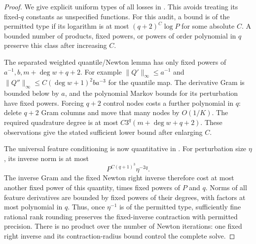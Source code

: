 \documentclass[11pt]{article}
\begin{document}
\begin{proof}
We give explicit uniform types of all losses in
. This avoids treating
its fixed-$q$ constants as unspecified functions.
For this audit, a bound is of the permitted type if its logarithm is
at most $(q+2)^C\log P$ for some absolute $C$. A bounded number of
products, fixed powers, or powers of order polynomial in $q$ preserve
this class after increasing $C$.

The separated weighted quantile/Newton lemma has only fixed powers of
$a^{-1},b,m+\deg w+q+2$. For example
$\|Q'\|_\infty\le a^{-1}$ and
$\|Q''\|_\infty\le C(\deg w+1)^2ba^{-3}$ for the quantile map.
The derivative Gram is bounded below by $a$, and the polynomial
Markov bounds for its perturbation have fixed powers. Forcing $q+2$
control nodes costs a further polynomial in $q$: delete $q+2$ Gram
columns and move that many nodes by $O(1/K)$. The required quadrature
degree is at most $C3^q(m+\deg w+q+2)$. These observations give the
stated sufficient lower bound after enlarging $C$.

The universal feature conditioning is now quantitative in
. For perturbation size $\eta$,
its inverse norm is at most
\[
 P^{C(q+1)^3}\eta^{-2q}.
\]
The inverse Gram and the fixed Newton right inverse therefore cost
at most another fixed power of this quantity, times fixed powers of
$P$ and $q$. Norms of all feature derivatives are bounded by fixed
powers of their degrees, with factors at most polynomial in $q$.
Thus, once $\eta^{-1}$ is of the permitted type, sufficiently fine
rational rank rounding preserves the fixed-inverse contraction with
permitted precision. There is no product over the number of Newton
iterations: one fixed right inverse and its contraction-radius bound
control the complete solve.


\end{proof}
\end{document}
